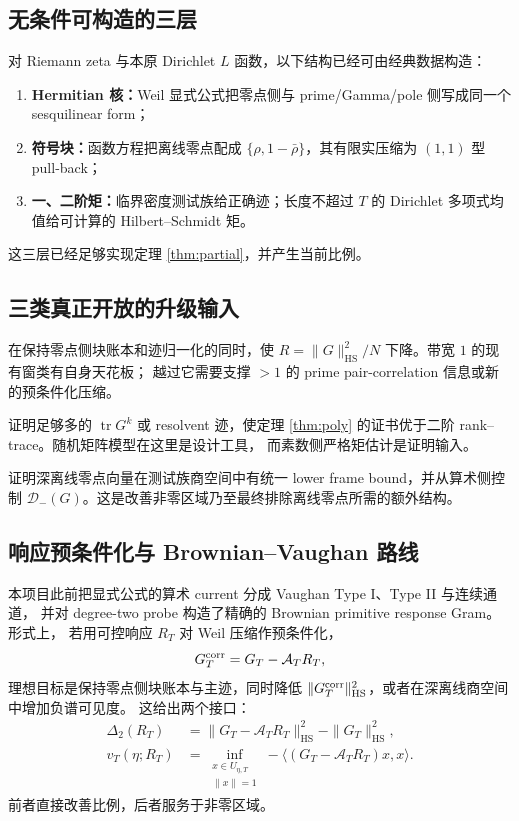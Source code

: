 \documentclass[UTF8,11pt,a4paper]{ctexart}
\theoremstyle{definition}
\theoremstyle{remark}
\newcommand{\tr}{\operatorname{tr}}
\newcommand{\HS}{\mathrm{HS}}
\begin{document}
\subsection{无条件可构造的三层}

对 Riemann zeta 与本原 Dirichlet $L$ 函数，以下结构已经可由经典数据构造：
\begin{enumerate}
\item \textbf{Hermitian 核：}Weil 显式公式把零点侧与
prime/Gamma/pole 侧写成同一个 sesquilinear form；
\item \textbf{符号块：}函数方程把离线零点配成
$\{\rho,1-\bar\rho\}$，其有限实压缩为 $(1,1)$ 型 pull-back；
\item \textbf{一、二阶矩：}临界密度测试族给正确迹；长度不超过 $T$ 的
Dirichlet 多项式均值给可计算的 Hilbert--Schmidt 矩。
\end{enumerate}
这三层已经足够实现定理 \ref{thm:partial}，并产生当前比例。

\subsection{三类真正开放的升级输入}

\begin{description}[leftmargin=3.7cm,style=nextline]
\item[更小的二阶矩常数]
在保持零点侧块账本和迹归一化的同时，使
$R=\|G\|_{\HS}^2/N$ 下降。带宽 $1$ 的现有窗类有自身天花板；
越过它需要支撑 $>1$ 的 prime pair-correlation 信息或新的预条件化压缩。

\item[高阶混合矩]
证明足够多的 $\tr G^k$ 或 resolvent 迹，使定理
\ref{thm:poly} 的证书优于二阶 rank--trace。随机矩阵模型在这里是设计工具，
而素数侧严格矩估计是证明输入。

\item[深度可见性与负谱预算]
证明深离线零点向量在测试族商空间中有统一 lower frame bound，并从算术侧控制
$\mathcal{D}_-(G)$。这是改善非零区域乃至最终排除离线零点所需的额外结构。
\end{description}

\subsection{响应预条件化与 Brownian--Vaughan 路线}

本项目此前把显式公式的算术 current 分成 Vaughan Type I、Type II 与连续通道，
并对 degree-two probe 构造了精确的 Brownian primitive response Gram。形式上，
若用可控响应 $R_T$ 对 Weil 压缩作预条件化，
\[
 G_T^{\rm corr}=G_T-\mathcal A_T R_T,
\]
理想目标是保持零点侧块账本与主迹，同时降低
$\|G_T^{\rm corr}\|_{\HS}^2$，或者在深离线商空间中增加负谱可见度。
这给出两个接口：
\begin{align}
 \Delta_2(R_T)
 &=\|G_T-\mathcal A_TR_T\|_{\HS}^2-\|G_T\|_{\HS}^2,\\
 v_T(\eta;R_T)
 &=\inf_{\substack{x\in U_{\eta,T}\\\|x\|=1}}
  -\langle(G_T-\mathcal A_TR_T)x,x\rangle.
\end{align}
前者直接改善比例，后者服务于非零区域。
\end{document}
